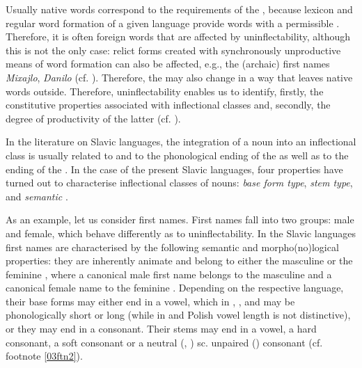 \documentclass[output=paper,colorlinks,citecolor=brown]{langscibook}
\begin{document}
Usually native words correspond to the requirements of the , because lexicon and regular word formation of a given language provide words with a permissible . Therefore, it is often foreign words that are affected by uninflectability, although this is not the only case: relict forms created with synchronously unproductive means of word formation can also be affected, e.g., the (archaic)  first names \emph{Mixajlo}, \emph{Danilo} (cf. \citealt[739]{zaliznjak2008}). Therefore, the  may also change in a way that leaves native words outside. Therefore, uninflectability enables us to identify, firstly, the constitutive properties associated with inflectional classes and, secondly, the degree of productivity of the latter (cf. \citealt{wurzel1984, dressler1997, dressler2003}).

In the literature on Slavic languages, the integration of a noun into an inflectional class is usually related to  and to the phonological ending of the  as well as to the ending of the  \citep{hentschelmenzel2009}. In the case of the present Slavic languages, four properties have turned out to characterise inflectional classes of nouns: \emph{base form type}, \emph{stem type}, \emph{} and \emph{semantic }.

As an example, let us consider first names. First names fall into two groups: male and female, which behave differently as to uninflectability. In the Slavic languages first names are characterised
by the following semantic and morpho(no)logical properties: they are inherently animate and belong to either the masculine or the feminine , where a canonical male first name belongs to the masculine  and a canonical female name to the feminine . Depending on the respective language, their base forms may either end in a vowel, which in , ,  and  may be phonologically short or long (while in  and Polish vowel length is not distinctive), or they may end in a consonant. Their stems may end in a vowel, a hard consonant, a soft consonant or a neutral (, ) sc. unpaired () consonant (cf. footnote \ref{03ftn2}).
\end{document}
